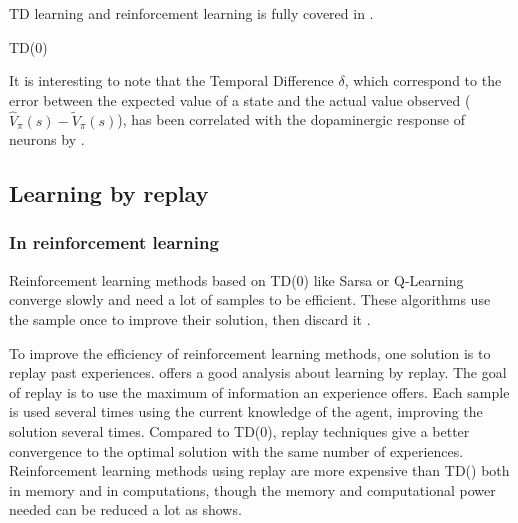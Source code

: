\documentclass[]{article}
\begin{document}
TD learning and reinforcement learning is fully covered in \textcite{sutton_reinforcement_1998}.

\begin{algorithm}[htbp]
  \DontPrintSemicolon
  \SetAlgoNoLine
  \caption{TD(0)  \label{alg:td0}}

\end{algorithm}

It is interesting to note that the Temporal Difference \(\delta\), which correspond to the error between the expected value of a state and the actual value observed (\(\hat{V}_\pi(s) - \tilde{V}_\pi(s)\)), has been correlated with the dopaminergic response of neurons by \textcite{hollerman_dopamine_1998}.


\subsection{Learning by replay}\label{learning-by-replay}

\subsubsection{In reinforcement learning}
\label{sub:In reinforcement learning}

Reinforcement learning methods based on TD(0) like Sarsa or Q-Learning converge slowly and need a lot of samples to be efficient. These algorithms use the sample once to improve their solution, then discard it \parencite{adam_experience_2012}.

To improve the efficiency of reinforcement learning methods, one solution is to replay past experiences. \textcite{vanseijen_deeper_2015} offers a good analysis about learning by replay. The goal of replay is to use the maximum of information an experience offers. Each sample is used several times using the current knowledge of the agent, improving the solution several times. Compared to TD(0), replay techniques give a better convergence to the optimal solution with the same number of experiences. Reinforcement learning methods using replay are more expensive than TD(\textlambda) both in memory and in computations, though the memory and computational power needed can be reduced a lot as \textcite{vanseijen_deeper_2015} shows.
\end{document}
